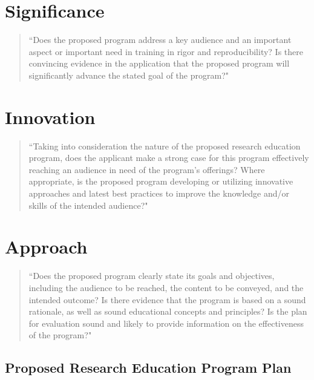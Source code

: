 \documentclass[pdftex,english,12pt,parskip=half]{scrartcl}
\begin{document}
\endgroup

\clearpage


\section{Significance}
\vspace{-0.1in}

\begin{quotation}
``Does the proposed program address a key audience and an important aspect or important need in training in rigor and reproducibility? Is there convincing evidence in the application that the proposed program will significantly advance the stated goal of the program?"
\end{quotation}

\section{Innovation}
\vspace{-0.1in}

\begin{quotation}
``Taking into consideration the nature of the proposed research education program, does the applicant make a strong case for this program effectively reaching an audience in need of the program's offerings? Where appropriate, is the proposed program developing or utilizing innovative approaches and latest best practices to improve the knowledge and/or skills of the intended audience?"
\end{quotation}

\section{Approach}

\begin{quotation}
``Does the proposed program clearly state its goals and objectives, including the audience to be reached, the content to be conveyed, and the intended outcome?  Is there evidence that the program is based on a sound rationale, as well as sound educational concepts and principles? Is the plan for evaluation sound and likely to provide information on the effectiveness of the program?"
\end{quotation}

\subsection{Proposed Research Education Program Plan}
\end{document}
